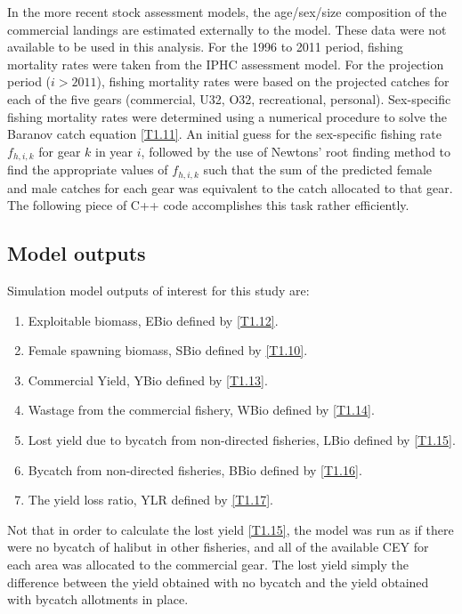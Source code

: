 
In the more recent stock assessment models, the age/sex/size composition of the commercial landings are estimated externally to the model.  These data were not available to be used in this analysis. For the 1996 to 2011 period, fishing mortality rates were taken from the IPHC assessment model.  For the projection period ($i>2011$), fishing mortality rates were based on the projected catches for each of the five gears (commercial, U32, O32, recreational, personal). Sex-specific fishing mortality rates were determined using a numerical procedure to solve the Baranov catch equation \eqref{T1.11}.  An initial guess for the sex-specific fishing rate $f_{h,i,k}$ for gear $k$ in year $i$, followed by the use of Newtons' root finding method to find the appropriate values of $f_{h,i,k}$ such that the sum of the predicted female and male catches for each gear was equivalent to the catch allocated to that gear.  The following piece of C++ code accomplishes this task rather efficiently.

\subsection{Model outputs} %
\label{sub:model_outputs}
Simulation model outputs of interest for this study are:
\begin{enumerate}
	\item Exploitable biomass,  EBio defined by \eqref{T1.12}.
	\item Female spawning biomass, SBio defined by \eqref{T1.10}.
	\item Commercial Yield, YBio defined by \eqref{T1.13}.
	\item Wastage from the commercial fishery, WBio defined by \eqref{T1.14}.
	\item Lost yield due to bycatch from non-directed fisheries, LBio defined by \eqref{T1.15}.
	\item Bycatch from non-directed fisheries, BBio defined by \eqref{T1.16}.
	\item The yield loss ratio, YLR defined by \eqref{T1.17}.
\end{enumerate}

Not that in order to calculate the lost yield \eqref{T1.15}, the model was run as if there were no bycatch of halibut in other fisheries, and all of the available CEY for each area was allocated to the commercial gear.  The lost yield simply the difference between the yield obtained with no bycatch and the yield obtained with bycatch allotments in place.





